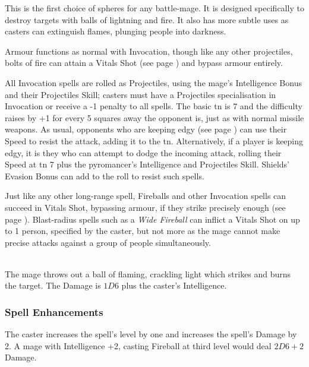 \begin{multicols}{2}

\noindent
This is the first choice of spheres for any battle-mage.
It is designed specifically to destroy targets with balls of lightning and fire.
It also has more subtle uses as casters can extinguish flames, plunging people into darkness.

Armour functions as normal with Invocation, though like any other projectiles, bolts of fire can attain a Vitals Shot (see page \pageref{vitals}) and bypass armour entirely.

All Invocation spells are rolled as Projectiles, using the mage's Intelligence Bonus and their Projectiles Skill;
casters must have a Projectiles specialisation in Invocation or receive a -1 penalty to all spells.
The basic \gls{tn} is 7 and the difficulty raises by +1 for every 5 squares away the opponent is, just as with normal missile weapons.
As usual, opponents who are keeping edgy (see page \pageref{edgy}) can use their Speed to resist the attack, adding it to the \gls{tn}.
Alternatively, if a player is keeping edgy, it is they who can attempt to dodge the incoming attack, rolling their Speed at \gls{tn} 7 plus the pyromancer's Intelligence and Projectiles Skill.
Shields' Evasion Bonus can add to the roll to resist such spells.

Just like any other long-range spell, Fireballs and other Invocation spells can succeed in Vitals Shot, bypassing armour, if they strike precisely enough (see page \pageref{vitals}).
Blast-radius spells such as a \textit{Wide Fireball} can inflict a Vitals Shot on up to 1 person, specified by the caster, but not more as the mage cannot make precise attacks against a group of people simultaneously.

\spelllevel

\\
The mage throws out a ball of flaming, crackling light which strikes and burns the target. The Damage is $1D6$ plus the caster's Intelligence.

\subsubsection{Spell Enhancements}

The caster increases the spell's level by one and increases the spell's Damage by 2.  A mage with Intelligence +2, casting Fireball at third level would deal $2D6+2$ Damage.


\end{multicols}
